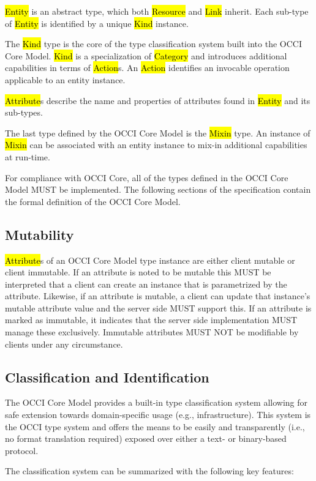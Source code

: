 \documentclass[10pt,a4paper]{article}
\begin{document}
\hl{Entity} is an abstract type, which both \hl{Resource} and \hl{Link}
inherit.  Each sub-type of \hl{Entity} is identified by a unique
\hl{Kind} instance.

The \hl{Kind} type is the core of the type classification system built
into the OCCI Core Model. \hl{Kind} is a specialization of
\hl{Category} and introduces additional capabilities in terms
of \hl{Action}s.  An \hl{Action} identifies an invocable operation
applicable to an entity instance.

\hl{Attribute}s describe the name and properties of attributes found in
\hl{Entity} and its sub-types.

The last type defined by the OCCI Core Model is the \hl{Mixin}
type. An instance of \hl{Mixin} can be associated with an entity
instance to mix-in additional capabilities at run-time.

For compliance with OCCI Core, all of the types defined in the OCCI
Core Model MUST be implemented.  The following sections of the
specification contain the formal definition of the OCCI Core Model.

\subsection{Mutability}
\label{sec:mutability}
\hl{Attribute}s of an OCCI Core Model type instance are either client
mutable or client immutable. If an attribute is noted to be mutable
this MUST be interpreted that a client can create an instance that is
parametrized by the attribute. Likewise, if an attribute is mutable, a
client can update that instance's mutable attribute value and the
server side MUST support this. If an attribute is marked as immutable,
it indicates that the server side implementation MUST manage these
exclusively. Immutable attributes MUST NOT be modifiable by clients
under any circumstance.

\subsection{Classification and Identification}
\label{sec:classification}
The OCCI Core Model provides a built-in type classification system
allowing for safe extension towards domain-specific usage
(e.g., infrastructure). This system is the OCCI type system and offers
the means to be easily and transparently (i.e., no format translation
required) exposed over either a text- or binary-based protocol.

The classification system can be summarized with the following key
features:
\end{document}
